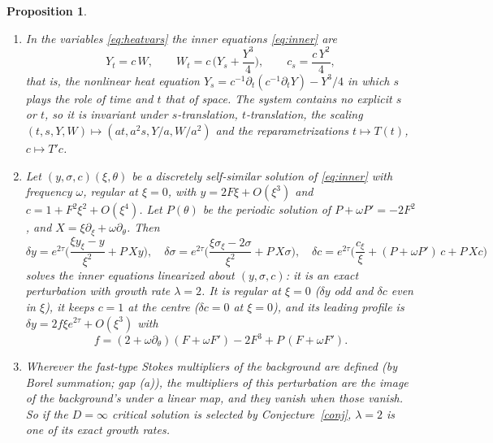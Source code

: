 \documentclass{amsart}
\numberwithin{equation}{section}
\theoremstyle{plain}
\newtheorem{proposition}{Proposition}
\theoremstyle{definition}
\theoremstyle{remark}
\begin{document}
\begin{proposition}\label{prop:5}
\begin{enumerate}[label=(\roman*),leftmargin=2em]
\item In the variables \eqref{eq:heatvars} the inner equations \eqref{eq:inner} are
\begin{equation}\label{eq:heat}
Y_t = c\,W, \qquad W_t = c\,\Big(Y_s + \frac{Y^3}{4}\Big), \qquad c_s = \frac{c\,Y^2}{4},
\end{equation}
that is, the nonlinear heat equation $Y_s = c^{-1}\partial_t(c^{-1}\partial_tY) - Y^3/4$ in which $s$ plays the role of time
and $t$ that of space. The system contains no explicit $s$ or $t$, so it is invariant under $s$-translation,
$t$-translation, the scaling $(t, s, Y, W) \mapsto (at, a^2s, Y/a, W/a^2)$ and the reparametrizations $t \mapsto T(t)$,
$c \mapsto T'c$.
\item Let $(y, \sigma, c)(\xi, \theta)$ be a discretely self-similar solution of \eqref{eq:inner} with frequency $\omega$,
regular at $\xi = 0$, with $y = 2F\xi + O(\xi^3)$ and $c = 1 + F^2\xi^2 + O(\xi^4)$. Let $P(\theta)$ be the periodic
solution of $P + \omega P' = -2F^2$, and $X = \xi\partial_\xi + \omega\partial_\theta$. Then
\begin{equation}\label{eq:mode2}
\delta y = e^{2\tau}\Big(\frac{\xi y_\xi - y}{\xi^2} + P\,Xy\Big), \quad
\delta\sigma = e^{2\tau}\Big(\frac{\xi \sigma_\xi - 2\sigma}{\xi^2} + P\,X\sigma\Big), \quad
\delta c = e^{2\tau}\Big(\frac{c_\xi}{\xi} + (P + \omega P')\,c + P\,Xc\Big)
\end{equation}
solves the inner equations linearized about $(y, \sigma, c)$: it is an exact perturbation with growth rate $\lambda = 2$.
It is regular at $\xi = 0$ ($\delta y$ odd and $\delta c$ even in $\xi$), it keeps $c = 1$ at the centre ($\delta c = 0$ at
$\xi = 0$), and its leading profile is $\delta y = 2f\xi e^{2\tau} + O(\xi^3)$ with
\begin{equation}\label{eq:f}
f = (2 + \omega\partial_\theta)(F + \omega F') - 2F^3 + P\,(F + \omega F') .
\end{equation}
\item Wherever the fast-type Stokes multipliers of the background are defined (by Borel summation; gap (a)), the
multipliers of this perturbation are the image of the background's under a linear map, and they vanish when those
vanish. So if the $D = \infty$ critical solution is selected by Conjecture~\ref{conj}, $\lambda = 2$ is one of its exact
growth rates.
\end{enumerate}
\end{proposition}
\end{document}
